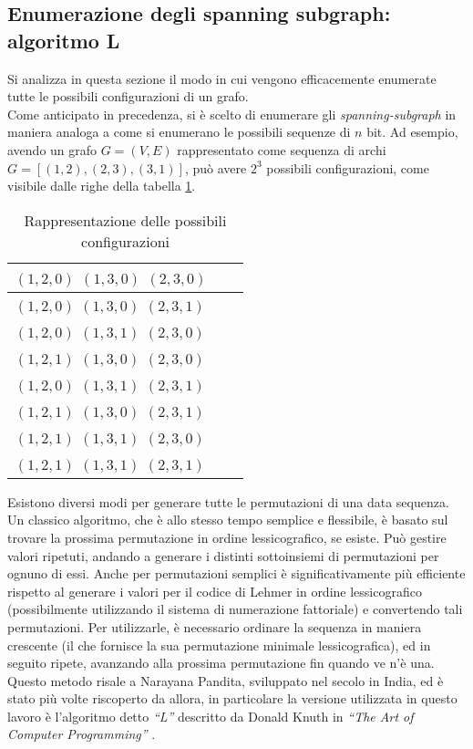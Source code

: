 \subsection{Enumerazione degli spanning subgraph: algoritmo L}\label{ssec:l}
Si analizza in questa sezione il modo in cui vengono efficacemente enumerate tutte le possibili configurazioni di un grafo.\\
Come anticipato in precedenza, si è scelto di enumerare gli \textit{spanning-subgraph} in maniera analoga a come si enumerano le possibili sequenze di $n$ bit. Ad esempio, avendo un grafo $G = (V, E)$ rappresentato come sequenza di archi $G = [(1,2), (2,3), (3,1)]$, può avere $2^3$ possibili configurazioni, come visibile dalle righe della tabella \ref{tab:configs}.
\begin{table}[]
	\centering
	\caption{Rappresentazione delle possibili configurazioni}
	\label{tab:configs}
	\begin{tabular}{|l|l|l|}
		\hline
		$(1,2,0)$ $(1,3,0)$ $(2,3,0)$ \\ \hline
		$(1,2,0)$ $(1,3,0)$ $(2,3,1)$ \\ \hline
		$(1,2,0)$ $(1,3,1)$ $(2,3,0)$ \\ \hline
		$(1,2,1)$ $(1,3,0)$ $(2,3,0)$ \\ \hline
		$(1,2,0)$ $(1,3,1)$ $(2,3,1)$ \\ \hline
		$(1,2,1)$ $(1,3,0)$ $(2,3,1)$ \\ \hline
		$(1,2,1)$ $(1,3,1)$ $(2,3,0)$ \\ \hline
		$(1,2,1)$ $(1,3,1)$ $(2,3,1)$ \\ \hline
	\end{tabular}
\end{table}
Esistono diversi modi per generare tutte le permutazioni di una data sequenza. Un classico algoritmo, che è allo stesso tempo semplice e flessibile, è basato sul trovare la prossima permutazione in ordine lessicografico, se esiste. Può gestire valori ripetuti, andando a generare i distinti sottoinsiemi di permutazioni per ognuno di essi. Anche per permutazioni semplici è significativamente più efficiente rispetto al generare i valori per il codice di Lehmer in ordine lessicografico (possibilmente utilizzando il sistema di numerazione fattoriale) e convertendo tali permutazioni. Per utilizzarle, è necessario ordinare la sequenza in maniera crescente (il che fornisce la sua permutazione minimale lessicografica), ed in seguito ripete, avanzando alla prossima permutazione fin quando ve n'è una. Questo metodo risale a Narayana Pandita, sviluppato nel  secolo in India, ed è stato più volte riscoperto da allora, in particolare la versione utilizzata in questo lavoro è l'algoritmo detto \textit{``L''} descritto da Donald Knuth in \textit{``The Art of Computer Programming''} \cite{donald1999art}.
